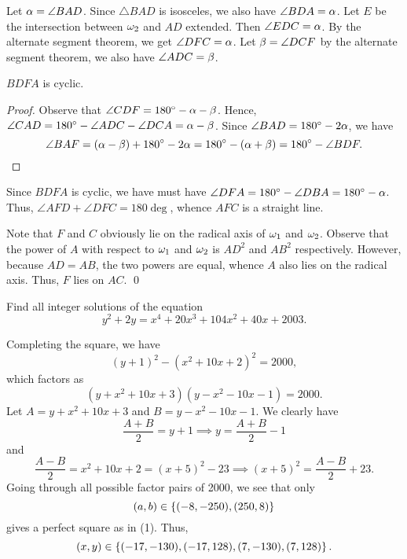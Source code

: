 \begin{solution}
    Let $\alpha = \angle BAD$. Since $\triangle BAD$ is isosceles, we also have $\angle BDA = \alpha$. Let $E$ be the intersection between $\omega_2$ and $AD$ extended. Then $\angle EDC = \alpha$. By the alternate segment theorem, we get $\angle DFC = \alpha$. Let $\beta = \angle DCF$ by the alternate segment theorem, we also have $\angle ADC = \beta$.

    \begin{claim*}
        $BDFA$ is cyclic.
    \end{claim*}
    \begin{proof}
        Observe that $\angle CDF = 180^{\circ} - \alpha - \beta$. Hence, $\angle CAD = 180^{\circ} - \angle ADC - \angle DCA = \alpha - \beta$. Since $\angle BAD = 180^{\circ} - 2\alpha$, we have \[\angle BAF = (\alpha - \beta) + 180^{\circ} - 2\alpha = 180^{\circ} - (\alpha + \beta) = 180^{\circ} - \angle BDF.\]
    \end{proof}
    
    Since $BDFA$ is cyclic, we have must have $\angle DFA = 180^{\circ} - \angle DBA = 180^{\circ} - \alpha$. Thus, $\angle AFD + \angle DFC = 180\deg$, whence $AFC$ is a straight line.
\end{solution}
\begin{solution}[\credit{https://www.youtube.com/watch?v=Mrjm7aWXoNQ}{Way Tan}]
    Note that $F$ and $C$ obviously lie on the radical axis of $\omega_1$ and $\omega_2$. Observe that the power of $A$ with respect to $\omega_1$ and $\omega_2$ is $AD^2$ and $AB^2$ respectively. However, because $AD = AB$, the two powers are equal, whence $A$ also lies on the radical axis. Thus, $F$ lies on $AC$. \qed
\end{solution}

\begin{question}[${(-17, -130), (-17, 128), (7, -130), (7, 128)}$]\label{A::2024-S-2-2}
    Find all integer solutions of the equation \[y^2 + 2y = x^4 + 20x^3 + 104x^2 + 40x + 2003.\]
\end{question}
\begin{solution*}
    Completing the square, we have \[(y + 1)^2 - (x^2 + 10x + 2)^2 = 2000,\] which factors as \[(y + x^2 + 10x + 3)(y - x^2 - 10x - 1) = 2000.\] Let $A = y + x^2 + 10x + 3$ and $B = y - x^2 - 10x - 1$. We clearly have \[\frac{A + B}{2} = y + 1 \implies y = \frac{A + B}{2} - 1\] and \[\frac{A - B}{2} = x^2 + 10x + 2 = (x+5)^2 - 23 \implies (x+5)^2 = \frac{A-B}{2} + 23 \tag{1}.\] Going through all possible factor pairs of 2000, we see that only \[(a, b) \in \left\lbrace (-8, -250), (250, 8) \right\rbrace\] gives a perfect square as in (1). Thus, \[(x, y) \in \left\lbrace (-17, -130), (-17, 128), (7, -130), (7, 128) \right\rbrace.\]
\end{solution*}

